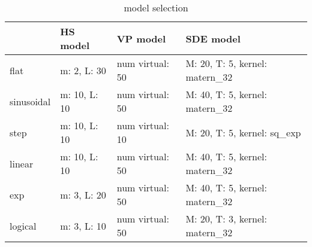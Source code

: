 \begin{table}[] 
 \centering
\begin{tabular}{llll}
\hline
 & HS model & VP model & SDE model \\
\hline
flat & m: 2, L: 30 & num virtual: 50 & M: 20, T: 5, kernel: matern_32 \\
sinusoidal & m: 10, L: 10 & num virtual: 50 & M: 40, T: 5, kernel: matern_32 \\
step & m: 10, L: 10 & num virtual: 10 & M: 20, T: 5, kernel: sq_exp \\
linear & m: 10, L: 10 & num virtual: 50 & M: 40, T: 5, kernel: matern_32 \\
exp & m: 3, L: 20 & num virtual: 50 & M: 40, T: 5, kernel: matern_32 \\
logical & m: 3, L: 10 & num virtual: 50 & M: 20, T: 3, kernel: matern_32 \\
\hline
\end{tabular}
\caption{model selection}
\label{tab:my_label}
\end{table}
